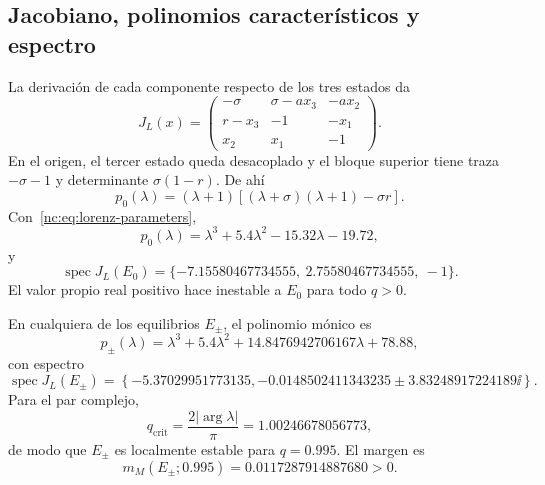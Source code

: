 \subsection{Jacobiano, polinomios característicos y espectro}

La derivación de cada componente respecto de los tres estados da
\begin{equation}
 J_L(x)=
 \begin{pmatrix}
 -\sigma&\sigma-a x_3&-a x_2\\
 r-x_3&-1&-x_1\\
 x_2&x_1&-1
 \end{pmatrix}.
 \label{nc:eq:lorenz-jacobian}
\end{equation}
En el origen, el tercer estado queda desacoplado y el bloque superior tiene
traza \(-\sigma-1\) y determinante \(\sigma(1-r)\). De ahí
\begin{equation}
 p_0(\lambda)
 =(\lambda+1)\left[(\lambda+\sigma)(\lambda+1)-\sigma r\right].
\end{equation}
Con~\eqref{nc:eq:lorenz-parameters},
\begin{equation}
 p_0(\lambda)=
 \lambda^3+5.4\lambda^2-15.32\lambda-19.72,
\end{equation}
y
\begin{equation}
 \operatorname{spec}J_L(E_0)=
 \{-7.15580467734555,\ 2.75580467734555,\ -1\}.
 \label{nc:eq:lorenz-origin-spectrum}
\end{equation}
El valor propio real positivo hace inestable a \(E_0\) para todo \(q>0\).

En cualquiera de los equilibrios \(E_{\pm}\), el polinomio mónico es
\begin{equation}
 p_{\pm}(\lambda)=
 \lambda^3+5.4\lambda^2
 +14.8476942706167\lambda+78.88,
\end{equation}
con espectro
\begin{equation}
 \operatorname{spec}J_L(E_{\pm})=
 \left\{
 -5.37029951773135,
 -0.0148502411343235\pm3.83248917224189\ii
 \right\}.
 \label{nc:eq:lorenz-outer-spectrum}
\end{equation}
Para el par complejo,
\begin{equation}
 q_{\mathrm{crit}}=
 \frac{2|\arg\lambda|}{\pi}=1.00246678056773,
\end{equation}
de modo que \(E_{\pm}\) es localmente estable para \(q=0.995\). El margen es
\begin{equation}
 m_M(E_{\pm};0.995)=0.0117287914887680>0.
\end{equation}

